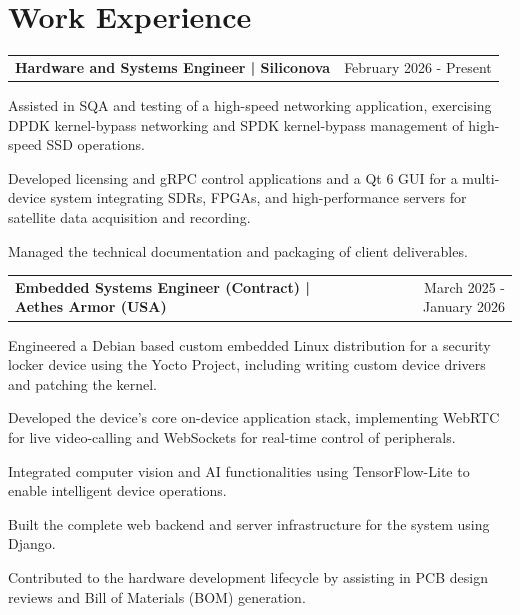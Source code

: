 \documentclass[letterpaper,11pt]{article}
\makeatletter
\newcommand{\resumeSubheading}[2]{
  \item
    \begin{tabularx}{0.97\textwidth}[t]{l@{\extracolsep{\fill}}r}
      \textbf{#1} & \small#2 \\
    \end{tabularx}
}
\newcommand{\resumeSubheadingSpacer}{\item\vspace{2pt}}
\newcommand{\resumeItem}[1]{\item\small #1}
\makeatother
\begin{document}
\section{Work Experience}
\begin{resumeSubHeadingList}
    \resumeSubheading
      {Hardware and Systems Engineer | Siliconova}{February 2026 - Present}
      \begin{resumeItemList}
        \resumeItem{Assisted in SQA and testing of a high-speed networking application, exercising DPDK kernel-bypass networking and SPDK kernel-bypass management of high-speed SSD operations.}
        \resumeItem{Developed licensing and gRPC control applications and a Qt 6 GUI for a multi-device system integrating SDRs, FPGAs, and high-performance servers for satellite data acquisition and recording.}
        \resumeItem{Managed the technical documentation and packaging of client deliverables.}
      \end{resumeItemList}

      \resumeSubheadingSpacer

    \resumeSubheading
      {Embedded Systems Engineer (Contract) | Aethes Armor (USA)}{March 2025 - January 2026}
      \begin{resumeItemList}
        \resumeItem{Engineered a Debian based custom embedded Linux distribution for a security locker device using the Yocto Project, including writing custom device drivers and patching the kernel.}
        \resumeItem{Developed the device's core on-device application stack, implementing WebRTC for live video-calling and WebSockets for real-time control of peripherals.}
        \resumeItem{Integrated computer vision and AI functionalities using TensorFlow-Lite to enable intelligent device operations.}
        \resumeItem{Built the complete web backend and server infrastructure for the system using Django.}
        \resumeItem{Contributed to the hardware development lifecycle by assisting in PCB design reviews and Bill of Materials (BOM) generation.}
      \end{resumeItemList}

      \resumeSubheadingSpacer


\end{resumeSubHeadingList}
\end{document}
